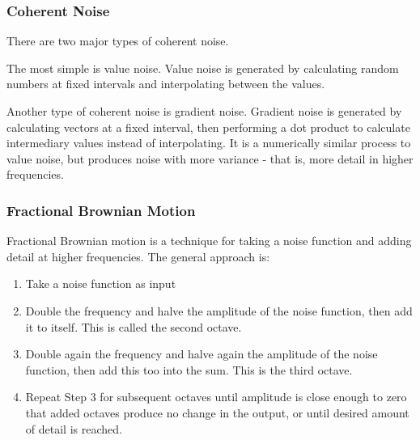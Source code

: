 \subsubsection{Coherent Noise}

There are two major types of coherent noise.


The most simple is value noise.
Value noise is generated by calculating random numbers at fixed intervals and interpolating between the values.



Another type of coherent noise is gradient noise.
Gradient noise is generated by calculating vectors at a fixed interval, then performing a dot product to calculate intermediary values instead of interpolating.
It is a numerically similar process to value noise, but produces noise with more variance - that is, more detail in higher frequencies.


\subsubsection{Fractional Brownian Motion}

Fractional Brownian motion is a technique for taking a noise function and adding detail at higher frequencies.
The general approach is:
\begin{enumerate}
\item Take a noise function as input
\item Double the frequency and halve the amplitude of the noise function, then add it to itself. This is called the second octave.
\item Double again the frequency and halve again the amplitude of the noise function, then add this too into the sum. This is the third octave.
\item Repeat Step 3 for subsequent octaves until amplitude is close enough to zero that added octaves produce no change in the output, or until desired amount of detail is reached.
\end{enumerate}

